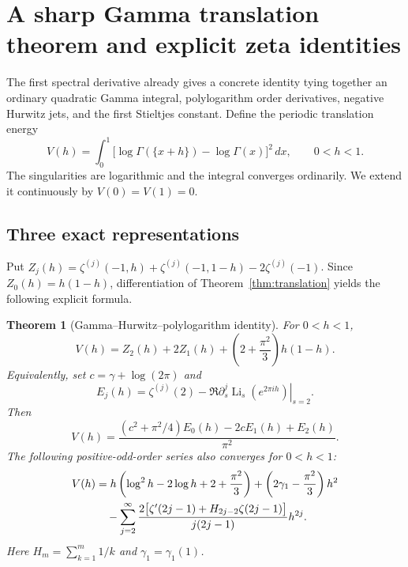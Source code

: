 \documentclass[11pt,a4paper]{article}
\numberwithin{equation}{section}
\newtheorem{theorem}{Theorem}[section]
\theoremstyle{definition}
\theoremstyle{remark}
\DeclareMathOperator{\Li}{Li}
\begin{document}


\section{A sharp Gamma translation theorem and explicit zeta identities}
\label{sec:gamma}

The first spectral derivative already gives a concrete identity tying
together an ordinary quadratic Gamma integral, polylogarithm order
derivatives, negative Hurwitz jets, and the first Stieltjes constant.
Define the periodic translation energy
\begin{equation}\label{eq:V-def}
 V(h)=\int_0^1
   \bigl[\log\Gamma(\{x+h\})-\log\Gamma(x)\bigr]^2\,dx,
 \qquad 0<h<1.
\end{equation}
The singularities are logarithmic and the integral converges ordinarily.
We extend it continuously by $V(0)=V(1)=0$.

\subsection{Three exact representations}

Put $Z_j(h)=\zeta^{(j)}(-1,h)+\zeta^{(j)}(-1,1-h)
-2\zeta^{(j)}(-1)$. Since $Z_0(h)=h(1-h)$, differentiation of
Theorem~\ref{thm:translation} yields the following explicit formula.

\begin{theorem}[Gamma--Hurwitz--polylogarithm identity]\label{thm:gamma-id}
For $0<h<1$,
\begin{equation}\label{eq:gamma-hurwitz}
 \boxed{\quad V(h)=Z_2(h)+2Z_1(h)
                  +\left(2+\frac{\pi^2}{3}\right)h(1-h).\quad}
\end{equation}
Equivalently, set $c=\gamma+\log(2\pi)$ and
\[
 E_j(h)=\zeta^{(j)}(2)-
       \Re\left.\partial_s^j\Li_s(e^{2\pi ih})\right|_{s=2}.
\]
Then
\begin{equation}\label{eq:gamma-polylog}
 V(h)=\frac{(c^2+\pi^2/4)E_0(h)-2cE_1(h)+E_2(h)}{\pi^2}.
\end{equation}
The following positive-odd-order series also converges for $0<h<1$:
\begin{align}
 V(h)&=h\left(\log^2h-2\log h+2+\frac{\pi^2}{3}\right)
          +\left(2\gamma_1-\frac{\pi^2}{3}\right)h^2\notag\\
 &\quad-\sum_{j=2}^{\infty}
    \frac{2\bigl[\zeta'(2j-1)+H_{2j-2}\zeta(2j-1)\bigr]}
         {j(2j-1)}h^{2j}.
 \label{eq:gamma-series}
\end{align}
Here $H_m=\sum_{k=1}^m1/k$ and $\gamma_1=\gamma_1(1)$.
\end{theorem}
\end{document}

